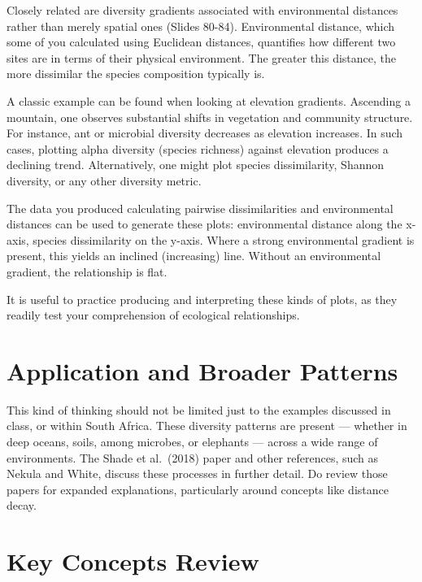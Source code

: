 \documentclass[
  10pt,
]{book}
\begin{document}
Closely related are diversity gradients associated with environmental
distances rather than merely spatial ones (Slides 80-84). Environmental
distance, which some of you calculated using Euclidean distances,
quantifies how different two sites are in terms of their physical
environment. The greater this distance, the more dissimilar the species
composition typically is.

A classic example can be found when looking at elevation gradients.
Ascending a mountain, one observes substantial shifts in vegetation and
community structure. For instance, ant or microbial diversity decreases
as elevation increases. In such cases, plotting alpha diversity (species
richness) against elevation produces a declining trend. Alternatively,
one might plot species dissimilarity, Shannon diversity, or any other
diversity metric.

The data you produced calculating pairwise dissimilarities and
environmental distances can be used to generate these plots:
environmental distance along the x-axis, species dissimilarity on the
y-axis. Where a strong environmental gradient is present, this yields an
inclined (increasing) line. Without an environmental gradient, the
relationship is flat.

It is useful to practice producing and interpreting these kinds of
plots, as they readily test your comprehension of ecological
relationships.

\section{Application and Broader
Patterns}\label{application-and-broader-patterns}

This kind of thinking should not be limited just to the examples
discussed in class, or within South Africa. These diversity patterns are
present --- whether in deep oceans, soils, among microbes, or elephants
--- across a wide range of environments. The Shade et al.~(2018) paper
and other references, such as Nekula and White, discuss these processes
in further detail. Do review those papers for expanded explanations,
particularly around concepts like distance decay.

\section{Key Concepts Review}\label{key-concepts-review}
\end{document}
